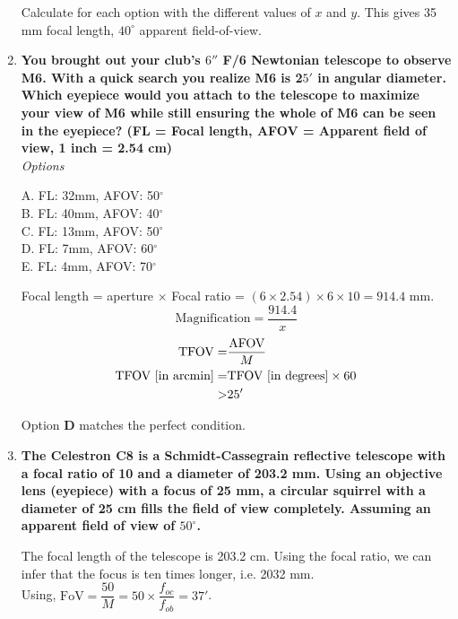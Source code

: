 \documentclass[a4paper,12pt]{extarticle}
\begin{document}
\begin{enumerate}
\begin{sol}
Calculate for each option with the different values of $x$ and $y$. This gives 35 mm focal length, $40^\circ$ apparent field-of-view.
\end{sol}
\item \textbf{You brought out your club’s $6''$ F/6 Newtonian telescope to observe M6. With a quick search you realize M6 is 2$5'$ in angular diameter. Which eyepiece would you attach to the telescope to maximize your view of M6 while still ensuring the whole of M6 can be seen in the eyepiece? (FL = Focal length, AFOV = Apparent field of view, 1 inch = 2.54 cm)}	\\

\textit{Options}
\begin{multicols}{2}
A. FL: 32mm, AFOV: 50$^\circ$\\
B. FL: 40mm, AFOV: 40$^\circ$\\
C. FL: 13mm, AFOV: 50$^\circ$\\
D. FL: 7mm, AFOV: 60$^\circ$\\
E. FL: 4mm, AFOV: 70$^\circ$
\end{multicols}


\begin{sol}
Focal length = aperture $\times$ Focal ratio = $(6\times 2.54) \times 6 \times 10  = 914.4$ mm.
\[\text{Magnification} =\frac{914.4}{x}\]
\begin{align*}
	\text{TFOV}=&\frac{\rm AFOV}{M}\\
	\text{TFOV [in arcmin]}=&\text{TFOV [in degrees]} \times 60\\
	>& 25'
\end{align*}

Option \textbf{D} matches the perfect condition.	
\end{sol}



\item \textbf{The Celestron C8 is a Schmidt-Cassegrain reflective telescope with a focal ratio of 10 and a diameter of 203.2 mm. Using an objective lens (eyepiece) with a focus of 25 mm, a circular squirrel with a diameter of 25 cm fills the field of view completely. Assuming an apparent field of view of $50^\circ$.}
\begin{sol}
The focal length of the telescope is 203.2 cm. Using the focal ratio, we can infer that the focus is ten times longer, i.e.
2032 mm.\\

Using, $\text{FoV} =\dfrac{50}{M}=50\times \dfrac{f_{oc}}{f_{ob}}=37'$.\\


\end{sol}
\end{enumerate}
\end{document}
